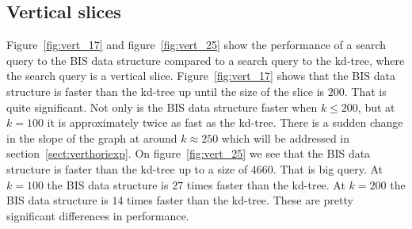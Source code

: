 \subsection{Vertical slices}

Figure~\ref{fig:vert_17} and figure~\ref{fig:vert_25} show the performance of a search query to the BIS data structure compared to a search query to the kd-tree, where the search query is a vertical slice. Figure~\ref{fig:vert_17} shows that the BIS data structure is faster than the kd-tree up until the size of the slice is $200$. That is quite significant. Not only is the BIS data structure faster when $k \leq 200$, but at $k = 100$ it is approximately twice as fast as the kd-tree. There is a sudden change in the slope of the graph at around $k \approx 250$ which will be addressed in section~\ref{sect:verthoriexp}. On figure~\ref{fig:vert_25} we see that the BIS data structure is faster than the kd-tree up to a size of $4660$. That is big query. At $k = 100$ the BIS data structure is $27$ times faster than the kd-tree. At $k = 200$ the BIS data structure is $14$ times faster than the kd-tree. These are pretty significant differences in performance. \\


